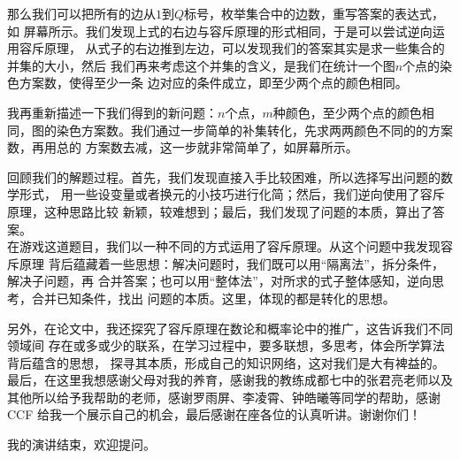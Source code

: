 \documentclass{noithesis}
\begin{document}
那么我们可以把所有的边从$1$到$Q$标号，枚举集合中的边数，重写答案的表达式，如
屏幕所示。我们发现上式的右边与容斥原理的形式相同，于是可以尝试逆向运用容斥原理，
从式子的右边推到左边，可以发现我们的答案其实是求一些集合的并集的大小，然后
我们再来考虑这个并集的含义，是我们在统计一个图$n$个点的染色方案数，使得至少一条
边对应的条件成立，即至少两个点的颜色相同。 \par

我再重新描述一下我们得到的新问题：$n$个点，$m$种颜色，至少两个点的颜色相同，图的染色方案数。我们通过一步简单的补集转化，先求两两颜色不同的的方案数，再用总的
方案数去减，这一步就非常简单了，如屏幕所示。 \par

回顾我们的解题过程。首先，我们发现直接入手比较困难，所以选择写出问题的数学形式，
用一些设变量或者换元的小技巧进行化简；然后，我们逆向使用了容斥原理，这种思路比较
新颖，较难想到；最后，我们发现了问题的本质，算出了答案。 \\

在游戏这道题目，我们以一种不同的方式运用了容斥原理。从这个问题中我发现容斥原理
背后蕴藏着一些思想：解决问题时，我们既可以用“隔离法”，拆分条件，解决子问题，再
合并答案；也可以用“整体法”，对所求的式子整体感知，逆向思考，合并已知条件，找出
问题的本质。这里，体现的都是转化的思想。 \par

另外，在论文中，我还探究了容斥原理在数论和概率论中的推广，这告诉我们不同领域间
存在或多或少的联系，在学习过程中，要多联想，多思考，体会所学算法背后蕴含的思想，
探寻其本质，形成自己的知识网络，这对我们是大有裨益的。 \\

最后，在这里我想感谢父母对我的养育，感谢我的教练成都七中的张君亮老师以及
其他所以给予我帮助的老师，感谢罗雨屏、李凌霄、钟皓曦等同学的帮助，感谢CCF
给我一个展示自己的机会，最后感谢在座各位的认真听讲。谢谢你们！ \par

我的演讲结束，欢迎提问。
\end{document}
